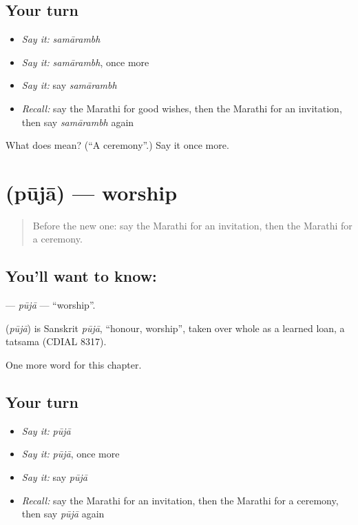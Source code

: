 \subsection*{Your turn}
\begin{itemize}
\raggedright
  \item \emph{Say it:} \emph{samārambh}
  \item \emph{Say it:} \emph{samārambh}, once more
  \item \emph{Say it:} say \emph{samārambh}
  \item \emph{Recall:} say the Marathi for good wishes, then the Marathi for an invitation, then say \emph{samārambh} again
\end{itemize}

\begin{tcolorbox}[breakable,colback=teal!4,colframe=teal!35!black,title={Before you move on}]
What does  mean? (\textquotedblleft{}A ceremony\textquotedblright{}.) Say it once more.
\end{tcolorbox}
\section[\texorpdfstring{\mr{पूजा} (pūjā)}{पूजा (pūjā)}]{ (pūjā) — worship}

\label{lesson:MR-C274-puja}



\begin{quote}
Before the new one: say the Marathi for an invitation, then the Marathi for a ceremony.
\end{quote}

\subsection*{You'll want to know: }
\textbf{} — \emph{pūjā} — \textquotedblleft{}worship\textquotedblright{}.

\begin{cousinweb}
\textbf{} (\emph{pūjā}) is Sanskrit \emph{pūjā}, \textquotedblleft{}honour, worship\textquotedblright{}, taken over whole as a learned loan, a tatsama (CDIAL 8317).
\end{cousinweb}

\begin{grammarlens}[title={What you've built}]
One more word for this chapter.
\end{grammarlens}

\subsection*{Your turn}
\begin{itemize}
\raggedright
  \item \emph{Say it:} \emph{pūjā}
  \item \emph{Say it:} \emph{pūjā}, once more
  \item \emph{Say it:} say \emph{pūjā}
  \item \emph{Recall:} say the Marathi for an invitation, then the Marathi for a ceremony, then say \emph{pūjā} again
\end{itemize}

